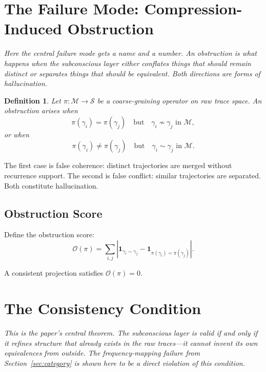\documentclass[12pt,a4paper]{article}
\newtheorem{definition}[theorem]{Definition}
\begin{document}
\section{The Failure Mode: Compression-Induced Obstruction}
\label{sec:obstruction}

\textit{Here the central failure mode gets a name and a number. An obstruction is what happens when the subconscious layer either conflates things that should remain distinct or separates things that should be equivalent. Both directions are forms of hallucination.}

\begin{definition}
Let $\pi : \mathcal{M} \rightarrow \mathcal{S}$ be a coarse-graining operator on raw trace space. An \emph{obstruction} arises when
\[
\pi(\gamma_i) = \pi(\gamma_j) \quad \text{but} \quad \gamma_i \not\sim \gamma_j \text{ in } \mathcal{M},
\]
or when
\[
\pi(\gamma_i) \neq \pi(\gamma_j) \quad \text{but} \quad \gamma_i \sim \gamma_j \text{ in } \mathcal{M}.
\]
\end{definition}

The first case is false coherence: distinct trajectories are merged without recurrence support. The second is false conflict: similar trajectories are separated. Both constitute hallucination.

\subsection{Obstruction Score}

Define the obstruction score:
\[
\mathcal{O}(\pi)
=
\sum_{i,j}
\left|
\mathbf{1}_{\gamma_i \sim \gamma_j}
-
\mathbf{1}_{\pi(\gamma_i)=\pi(\gamma_j)}
\right|.
\]

A consistent projection satisfies $\mathcal{O}(\pi) = 0$.

\section{The Consistency Condition}
\label{sec:consistency}

\textit{This is the paper's central theorem. The subconscious layer is valid if and only if it refines structure that already exists in the raw traces---it cannot invent its own equivalences from outside. The frequency-mapping failure from Section~\ref{sec:category} is shown here to be a direct violation of this condition.}
\end{document}
